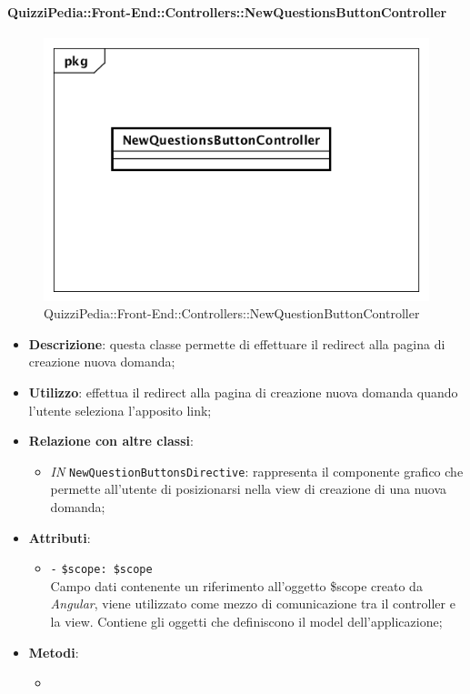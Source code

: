 \paragraph{QuizziPedia::Front-End::Controllers::NewQuestionsButtonController}
\begin{figure}
	\centering
	\includegraphics[scale=0.45]{UML/Classi/Front-End/QuizziPedia_Front-end_Controller_NewQuestionsButtonController.png}
	\caption{QuizziPedia::Front-End::Controllers::NewQuestionButtonController}
\end{figure}
\begin{itemize}
	\item \textbf{Descrizione}: questa classe permette di effettuare il redirect alla pagina di creazione nuova domanda;
	\item \textbf{Utilizzo}: effettua il redirect alla pagina di creazione nuova domanda quando l'utente seleziona l'apposito link;
	\item \textbf{Relazione con altre classi}:
	\begin{itemize}
		\item \textit{IN} \texttt{NewQuestionButtonsDirective}: rappresenta il componente grafico che permette all'utente di posizionarsi nella view di creazione di una nuova domanda; 
	\end{itemize}
	\item \textbf{Attributi}:
	\begin{itemize}
		\item \texttt{-} \texttt{\$scope: \$scope} \\
		Campo dati contenente un riferimento all’oggetto \$scope creato da \textit{Angular}, viene utilizzato come mezzo di comunicazione tra il controller e la view. Contiene gli oggetti che definiscono il model dell’applicazione;
	\end{itemize}
	\item \textbf{Metodi}:
	\begin{itemize}
		\item 
	\end{itemize}
\end{itemize}

